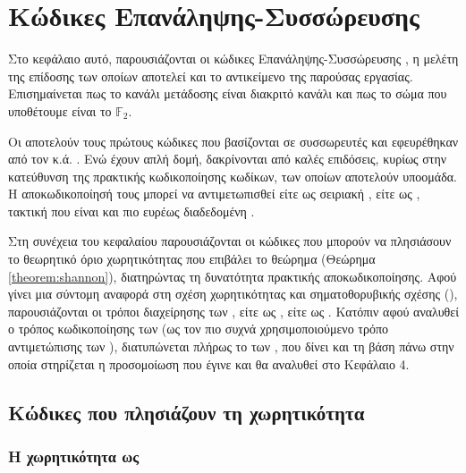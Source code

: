 \chapter{Κώδικες Επανάληψης-Συσσώρευσης }


Στο κεφάλαιο αυτό, παρουσιάζονται οι κώδικες Επανάληψης-Συσσώρευσης , η μελέτη της επίδοσης των οποίων αποτελεί και το αντικείμενο της παρούσας εργασίας. Επισημαίνεται πως το κανάλι μετάδοσης είναι διακριτό  κανάλι και πως το σώμα που υποθέτουμε είναι το $\mathbb{F}_2$.

Οι  αποτελούν τους πρώτους κώδικες που βασίζονται σε συσσωρευτές και εφευρέθηκαν από τον  κ.ά. \cite{divsalar1998coding}. Ενώ έχουν απλή δομή, δακρίνονται από καλές επιδόσεις, κυρίως στην κατεύθυνση της πρακτικής κωδικοποίησης  κωδίκων, των οποίων αποτελούν υποομάδα. Η αποκωδικοποίησή τους μπορεί να αντιμετωπισθεί είτε ως σειριακή , είτε ως , τακτική που είναι και πιο ευρέως διαδεδομένη \cite{ryan2009channel}.

Στη συνέχεια του κεφαλαίου παρουσιάζονται οι κώδικες που μπορούν να πλησιάσουν το θεωρητικό όριο χωρητικότητας που επιβάλει το θεώρημα  (Θεώρημα \ref{theorem:shannon}), διατηρώντας τη δυνατότητα πρακτικής αποκωδικοποίησης. Αφού γίνει μια σύντομη αναφορά στη σχέση χωρητικότητας και σηματοθορυβικής σχέσης (), παρουσιάζονται οι τρόποι διαχείρησης των , είτε ως , είτε ως . Κατόπιν αφού αναλυθεί ο τρόπος κωδικοποίησης των  (ως τον πιο συχνά χρησιμοποιούμενο τρόπο αντιμετώπισης των ), διατυπώνεται πλήρως το  των , που δίνει και τη βάση πάνω στην οποία στηρίζεται η προσομοίωση που έγινε και θα αναλυθεί στο Κεφάλαιο 4.

\section{Κώδικες που πλησιάζουν τη χωρητικότητα}
\en{\lipsum[1]}

\subsection{Η χωρητικότητα ως }

